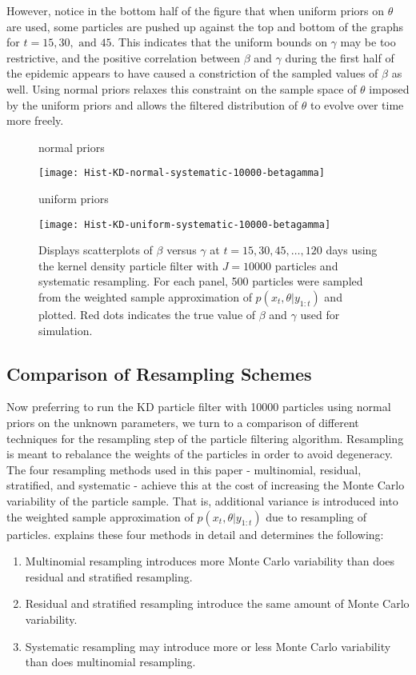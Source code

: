 \documentclass{elsarticle}
\begin{document}
However, notice in the bottom half of the figure that when uniform priors on $\theta$ are used, some particles are pushed up against the top and bottom of the graphs for $t = 15, 30, \mbox{ and } 45$.  This indicates that the uniform bounds on $\gamma$ may be too restrictive, and the positive correlation between $\beta$ and $\gamma$ during the first half of the epidemic appears to have caused a constriction of the sampled values of $\beta$ as well.  Using normal priors relaxes this constraint on the sample space of $\theta$ imposed by the uniform priors and allows the filtered distribution of $\theta$ to evolve over time more freely.

\begin{figure}
\centering
\begin{minipage}{1.0\linewidth}
\caption*{normal priors}
\texttt{[image: Hist-KD-normal-systematic-10000-betagamma]}
\end{minipage}
\begin{minipage}{1.0\linewidth}
\caption*{uniform priors}
\texttt{[image: Hist-KD-uniform-systematic-10000-betagamma]}
\end{minipage}
\caption{Displays scatterplots of $\beta$ versus $\gamma$ at $t = 15, 30, 45,\ldots,120$ days using the kernel density particle filter with $J = 10000$ particles and systematic resampling.  For each panel, 500 particles were sampled from the weighted sample approximation of $p(x_t,\theta|y_{1:t})$ and plotted.  Red dots indicates the true value of $\beta$ and $\gamma$ used for simulation.} \label{fig:priors}
\end{figure}

\subsection{Comparison of Resampling Schemes}

Now preferring to run the KD particle filter with 10000 particles using normal priors on the unknown parameters, we turn to a comparison of different techniques for the resampling step of the particle filtering algorithm.  Resampling is meant to rebalance the weights of the particles in order to avoid degeneracy.  The four resampling methods used in this paper - multinomial, residual, stratified, and systematic - achieve this at the cost of increasing the Monte Carlo variability of the particle sample.  That is, additional variance is introduced into the weighted sample approximation of $p(x_t,\theta|y_{1:t})$ due to resampling of particles.  \citet{Douc:Capp:Moul:comp:2005} explains these four methods in detail and determines the following:
\begin{enumerate}
\item Multinomial resampling introduces more Monte Carlo variability than does residual and stratified resampling.
\item Residual and stratified resampling introduce the same amount of Monte Carlo variability.
\item Systematic resampling may introduce more or less Monte Carlo variability than does multinomial resampling.
\end{enumerate}
\end{document}
